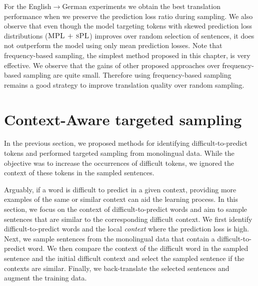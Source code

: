 For the English$\rightarrow$German experiments we obtain the best translation performance when we preserve the prediction loss ratio during sampling.
We also observe that even though the model targeting tokens with skewed prediction loss distributions ($\textsc{MPL + sPL}$) improves over random selection of sentences, it does not outperform the model using only mean prediction losses. 
Note that frequency-based sampling, the simplest method proposed in this chapter, is very effective.
We observe that the gains of other proposed approaches over frequency-based sampling are quite small. 
Therefore using frequency-based sampling remains a good strategy to improve translation quality over random sampling. 

\section{Context-Aware targeted sampling} \label{btcontextu}

In the previous section, we proposed methods for identifying difficult-to-predict tokens and performed targeted sampling from monolingual data.
While the objective was to increase the occurrences of difficult tokens, we ignored the context of these tokens in the sampled sentences. 

Arguably, if a word is difficult to predict in a given context, providing more examples of the same or similar context can aid the learning process.
In this section, we focus on the context of difficult-to-predict words and aim to sample sentences that are similar to the corresponding difficult context.
We first identify difficult-to-predict words and the local \textit{context} where the prediction loss is high. 
Next, we sample sentences from the monolingual data that contain a difficult-to-predict word. 
We then compare the context of the difficult word in the sampled sentence and the initial difficult context and select the sampled sentence if the contexts are similar. 
Finally, we back-translate the selected sentences and augment the training data.

